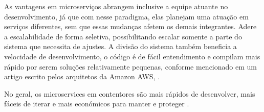 As vantagens em microserviços abrangem inclusive a equipe atuante no desenvolvimento, já que com nesse paradigma,
elas planejam uma atuação em serviços diferentes, sem que essas mudanças afetem os demais integrantes.
Adere a escalabilidade de forma seletiva, possibilitando escalar somente a parte do sistema que necessita de ajustes.
A divisão do sistema também beneficia a velocidade de desenvolvimento, o código é de fácil entendimento e
compilam mais rápido por serem soluções relativamente pequenas, conforme mencionado em um artigo escrito pelos
arquitetos da Amazon AWS, .

\begin{citacao}
No geral, os microservices em contentores são mais rápidos de desenvolver,
mais fáceis de iterar e mais económicos para manter e
proteger \cite{deploying-java-microservices-on-amazon-ec2-container-service}.
\end{citacao}
